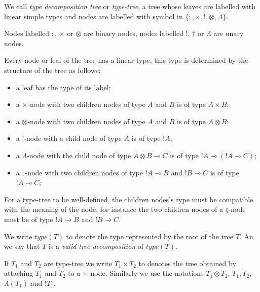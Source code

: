 \begin{dfn}
We call \emph{type decomposition tree} or \emph{type-tree}, a tree whose leaves are labelled with linear simple types
and nodes are labelled with symbol in
$\{ ;, \times, !, \otimes, \Lambda \} $.

Nodes labelled $;$, $\times$ or $\otimes$ are binary nodes, nodes labelled $!$, $\dagger$ or $\Lambda$ are unary nodes.


Every node or leaf of the tree has a linear type, this type is determined by the
structure of the tree as follows:
\begin{itemize}
\item a leaf has the type of its label;

\item a $\times$-node with two children nodes of type $A$
and $B$ is of type $A \times B$;

\item a $\otimes$-node with two children nodes of type $A$
and $B$ is of type $A\otimes B$;

\item a $!$-node with a child node of type $A$ is of type $!A$;

\item a $\Lambda$-node with the child node of type $A \otimes B \multimap C$ is of type $!A \multimap (!A \multimap C)$;

\item a $;$-node with two children nodes of type $!A\multimap B$
and $!B \multimap C$ is of type $!A \multimap C$;

\end{itemize}

For a type-tree to be well-defined, the children nodes's type must be compatible with the meaning of the node, for instance
the two children nodes of a $\fatsemi$-node must be of type $!A\rightarrow B$ and $!B\rightarrow C$.

We write $type(T)$ to denote the type represented by the root of the tree $T$. An we say that $T$ is a \emph{valid
tree decomposition} of $type(T)$.

If $T_1$ and $T_2$ are type-tree we write $T_1 \times T_2$ to denotes the tree obtained by attaching $T_1$ and $T_2$ to a $\times$-node.
Similarly we use the notations $T_1 \otimes T_2$, $T_1 ; T_2$, $\Lambda(T_1)$ and $!T_1$.
\end{dfn}


